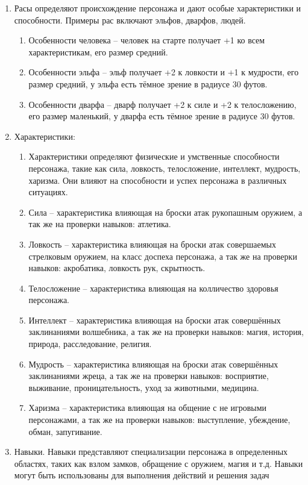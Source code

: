 \begin{enumerate}
		\item Расы определяют происхождение персонажа и дают особые характеристики и способности. Примеры рас включают эльфов, дварфов, людей.
			\begin{enumerate}
			\item Особенности человека -- человек на старте получает +1 ко всем характеристикам, его размер средний.
			\item Особенности эльфа -- эльф получает +2 к ловкости и +1 к мудрости, его размер средний, у эльфа есть тёмное зрение в радиусе 30 футов.
			\item Особенности дварфа -- дварф получает +2 к силе и +2 к телосложению, его размер маленький, у дварфа есть тёмное зрение в радиусе 30 футов.
			\end{enumerate}
		\item Характеристики:
		\begin{enumerate}
			\item Характеристики определяют физические и умственные способности персонажа, такие как сила, ловкость, телосложение, интеллект, мудрость, харизма. Они влияют на способности и успех персонажа в различных ситуациях.
			\item Сила -- характеристика влияющая на броски атак рукопашным оружием, а так же на проверки навыков: атлетика.
			\item Ловкость -- характеристика влияющая на броски атак совершаемых стрелковым оружием, на класс доспеха персонажа, а так же на проверки навыков: акробатика, ловкость рук, скрытность.
			\item Телосложение -- характеристика влияющая на колличество здоровья персонажа.
			\item Интеллект -- характеристика влияющая на броски атак совершённых заклинаниями волшебника, а так же на проверки навыков: магия, история, природа, расследование, религия.
			\item Мудрость -- характеристика влияющая на броски атак  совершённых заклинаниями жреца, а так же на проверки навыков: восприятие, выживание, проницательность, уход за животными, медицина.
			\item Харизма -- характеристика влияющая на общение с не игровыми персонажами, а так же на проверки навыков: выступление, убеждение, обман, запугивание.
		\end{enumerate}
			\item Навыки. Навыки представляют специализации персонажа в определенных областях, таких как взлом замков, обращение с оружием, магия и т.д. Навыки могут быть использованы для выполнения действий и решения задач

\end{enumerate}
